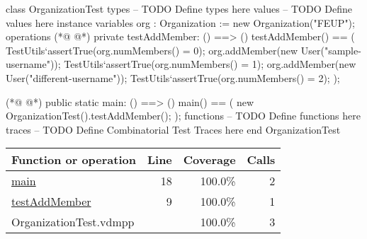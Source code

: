 \begin{vdmpp}[breaklines=true]
class OrganizationTest
 types
 -- TODO Define types here
 values
 -- TODO Define values here
 instance variables
  org : Organization := new Organization("FEUP");
 operations
(*@
\label{testAddMember:9}
@*)
  private testAddMember: () ==> ()
  testAddMember() == (
   TestUtils`assertTrue(org.numMembers() = 0);
   org.addMember(new User("sample-username"));
   TestUtils`assertTrue(org.numMembers() = 1);
   org.addMember(new User("different-username"));
   TestUtils`assertTrue(org.numMembers() = 2);
  );
  
(*@
\label{main:18}
@*)
  public static main: () ==> ()
  main() ==
  (
   new OrganizationTest().testAddMember();
  );
 functions
 -- TODO Define functions here
 traces
 -- TODO Define Combinatorial Test Traces here
end OrganizationTest
\end{vdmpp}
\bigskip
\begin{longtable}{|l|r|r|r|}
\hline
Function or operation & Line & Coverage & Calls \\
\hline
\hline
\hyperref[main:18]{main} & 18&100.0\% & 2 \\
\hline
\hyperref[testAddMember:9]{testAddMember} & 9&100.0\% & 1 \\
\hline
\hline
OrganizationTest.vdmpp & & 100.0\% & 3 \\
\hline
\end{longtable}

